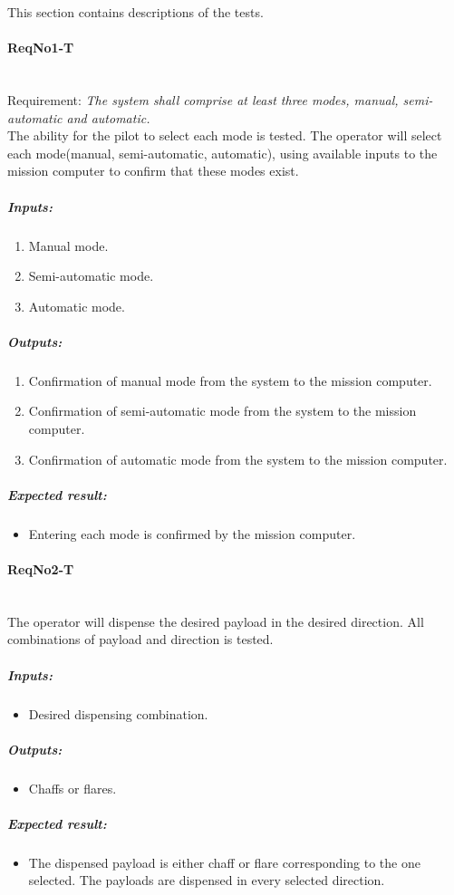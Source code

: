 This section contains descriptions of the tests.

\paragraph{ReqNo1-T}\mbox{}\\ %
Requirement: \textit{The system shall comprise at least three modes, manual, semi-automatic and automatic.}\\
The ability for the pilot to select each mode is tested. The operator will select each mode(manual, semi-automatic, automatic), using available inputs to the mission computer to confirm that these modes exist.

\subparagraph{Inputs:}
	\begin{enumerate}
	\item Manual mode.
	\item Semi-automatic mode.
	\item Automatic mode.
	\end{enumerate}
	\subparagraph{Outputs:}
	\begin{enumerate}
	\item Confirmation of manual mode from the system to the mission computer.
	\item Confirmation of semi-automatic mode from the system to the mission computer.
	\item Confirmation of automatic mode from the system to the mission computer.
	\end{enumerate}
	\subparagraph{Expected result:}
	\begin{itemize}
	\item Entering each mode is confirmed by the mission computer.
	\end{itemize}

\paragraph{ReqNo2-T}\mbox{}\\ %
The operator will dispense the desired payload in the desired direction. All combinations of payload and direction is tested.
\\
	\subparagraph{Inputs:}
	\begin{itemize}
	\item Desired dispensing combination.
	\end{itemize}
	\subparagraph{Outputs:}
	\begin{itemize}
	\item Chaffs or flares.
	\end{itemize}
	\subparagraph{Expected result:}
	\begin{itemize}
	\item The dispensed payload is either chaff or flare corresponding to the one selected. The payloads are dispensed in every selected direction.
	\end{itemize}

